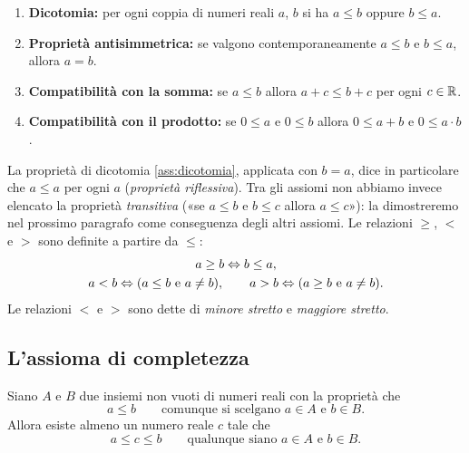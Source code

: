 \begin{assioma}\label{ass:ordine}
\leavevmode
\begin{enumerate}[label=\textup{(O\arabic*)}, ref=(O\arabic*), leftmargin=3em]
  \item\label{ass:dicotomia} \textbf{Dicotomia:} per ogni coppia di numeri reali $a$, $b$ si
    ha $a\le b$ oppure $b\le a$.
  \item\label{ass:antisimmetrica} \textbf{Proprietà antisimmetrica:} se valgono
    contemporaneamente $a\le b$ e $b\le a$, allora $a=b$.
  \item\label{ass:ordine-somma} \textbf{Compatibilità con la somma:} se $a\le b$ allora
    $a+c\le b+c$ per ogni $c\in\mathbb{R}$.
  \item\label{ass:ordine-prodotto} \textbf{Compatibilità con il prodotto:} se $0\le a$ e
    $0\le b$ allora $0\le a+b$ e $0\le a\cdot b$.
\end{enumerate}
\end{assioma}

\begin{osservazione}
La proprietà di dicotomia \ref{ass:dicotomia}, applicata con $b=a$, dice in particolare
che $a\le a$ per ogni $a$ (\emph{proprietà riflessiva}). Tra gli assiomi non abbiamo
invece elencato la proprietà \emph{transitiva} («se $a\le b$ e $b\le c$ allora
$a\le c$»): la dimostreremo nel prossimo paragrafo come conseguenza degli altri assiomi.
Le relazioni $\ge$, $<$ e $>$ sono definite a partire da $\le$:
\begin{gather*}
  a\ge b \Leftrightarrow b\le a, \\
  a<b \Leftrightarrow (a\le b \text{ e } a\neq b), \qquad
  a>b \Leftrightarrow (a\ge b \text{ e } a\neq b).
\end{gather*}
Le relazioni $<$ e $>$ sono dette di \emph{minore stretto} e \emph{maggiore stretto}.
\end{osservazione}

\subsection{L'assioma di completezza}

\begin{assioma}[Completezza]\label{ass:completezza}
Siano $A$ e $B$ due insiemi non vuoti di numeri reali con la proprietà che
\[
  a\le b \qquad\text{comunque si scelgano } a\in A \text{ e } b\in B.
\]
Allora esiste almeno un numero reale $c$ tale che
\[
  a\le c\le b \qquad\text{qualunque siano } a\in A \text{ e } b\in B.
\]
\end{assioma}

